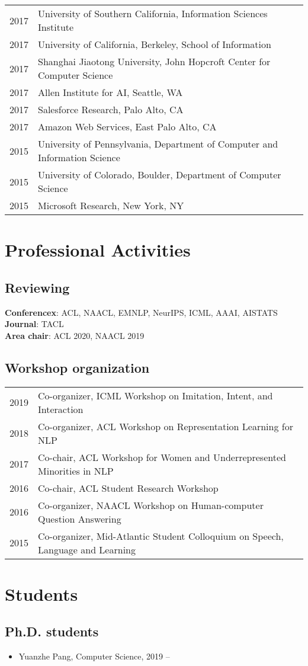 \documentclass[a4paper,11pt]{article}
\begin{document}
\begin{longtable}{rl}
    2017 & University of Southern California, Information Sciences Institute \\
    2017 & University of California, Berkeley, School of Information \\
    2017 & Shanghai Jiaotong University, John Hopcroft Center for Computer Science \\
    2017 & Allen Institute for AI, Seattle, WA \\
    2017 & Salesforce Research, Palo Alto, CA \\
    2017 & Amazon Web Services, East Palo Alto, CA \\
    2015 & University of Pennsylvania, Department of Computer and Information Science \\
    2015 & University of Colorado, Boulder, Department of Computer Science \\
    2015 & Microsoft Research, New York, NY \\
\end{longtable}

\section{Professional Activities}
\subsection{Reviewing}
\textbf{Conferencex}: ACL, NAACL, EMNLP, NeurIPS, ICML, AAAI, AISTATS \\
\textbf{Journal}: TACL \\
\textbf{Area chair}: ACL 2020, NAACL 2019

\subsection{Workshop organization}
\begin{longtable}{rl}
2019 & Co-organizer, ICML Workshop on Imitation, Intent, and Interaction \\
2018 & Co-organizer, ACL Workshop on Representation Learning for NLP \\
2017 & Co-chair, ACL Workshop for Women and Underrepresented Minorities in NLP \\
2016 & Co-chair, ACL Student Research Workshop \\
2016 & Co-organizer, NAACL Workshop on Human-computer Question Answering \\
2015 & Co-organizer, Mid-Atlantic Student Colloquium on Speech, Language and Learning
\end{longtable}

\section{Students}
\subsection{Ph.D. students}
\begin{itemize}
    \item Yuanzhe Pang, Computer Science, 2019 --
\end{itemize}
\end{document}
